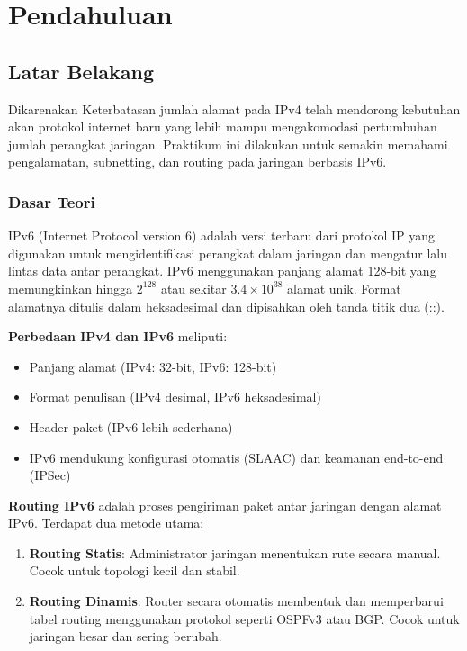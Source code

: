 \section{Pendahuluan}
\subsection{Latar Belakang}
Dikarenakan Keterbatasan jumlah alamat pada IPv4 telah mendorong kebutuhan akan protokol internet baru yang lebih mampu mengakomodasi pertumbuhan jumlah perangkat jaringan. Praktikum ini dilakukan untuk semakin memahami pengalamatan, subnetting, dan routing pada jaringan berbasis IPv6.

\subsubsection{Dasar Teori}
{IPv6 (Internet Protocol version 6)} adalah versi terbaru dari protokol IP yang digunakan untuk mengidentifikasi perangkat dalam jaringan dan mengatur lalu lintas data antar perangkat. IPv6 menggunakan panjang alamat 128-bit yang memungkinkan hingga $2^{128}$ atau sekitar $3.4 \times 10^{38}$ alamat unik. Format alamatnya ditulis dalam heksadesimal dan dipisahkan oleh tanda titik dua (::).

\textbf{Perbedaan IPv4 dan IPv6} meliputi:
\begin{itemize}
    \item Panjang alamat (IPv4: 32-bit, IPv6: 128-bit)
    \item Format penulisan (IPv4 desimal, IPv6 heksadesimal)
    \item Header paket (IPv6 lebih sederhana)
    \item IPv6 mendukung konfigurasi otomatis (SLAAC) dan keamanan end-to-end (IPSec)
\end{itemize}

\textbf{Routing IPv6} adalah proses pengiriman paket antar jaringan dengan alamat IPv6. Terdapat dua metode utama:
\begin{enumerate}
    \item \textbf{Routing Statis}: Administrator jaringan menentukan rute secara manual. Cocok untuk topologi kecil dan stabil.
    \item \textbf{Routing Dinamis}: Router secara otomatis membentuk dan memperbarui tabel routing menggunakan protokol seperti OSPFv3 atau BGP. Cocok untuk jaringan besar dan sering berubah.
\end{enumerate}



